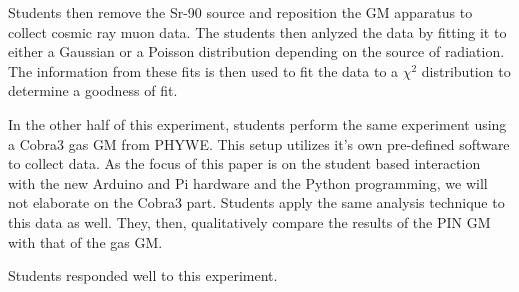 Students then remove the Sr-90 source and reposition the GM apparatus to collect cosmic ray muon data.
The students then anlyzed the data by fitting it to either a Gaussian or a Poisson distribution depending on the source of radiation.
The information from these fits is then used to fit the data to a $\chi^{2}$ distribution to determine a goodness of fit.


In the other half of this experiment, students perform the same experiment using a Cobra3 gas GM from PHYWE.
This setup utilizes it's own pre-defined software to collect data.
As the focus of this paper is on the student based interaction with the new Arduino and Pi hardware and the Python programming, we will not elaborate on the Cobra3 part.
Students apply the same analysis technique to this data as well.
They, then, qualitatively compare the results of the PIN GM with that of the gas GM.

Students responded well to this experiment.

